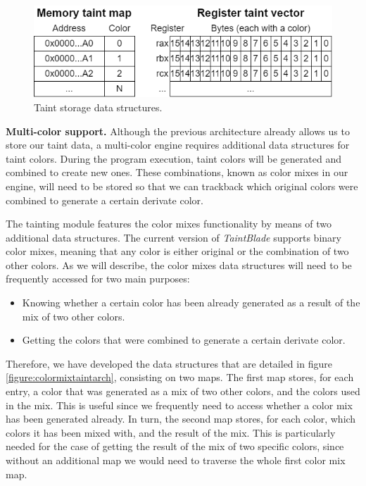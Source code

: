 \documentclass[conference]{IEEEtran}
\begin{document}
\begin{figure}
    \centerline{\includegraphics[width=0.9\columnwidth]{images/TaintingEngine.drawio.png}}
    \caption{Taint storage data structures.}
    \label{figure:taintingengine}
\end{figure}

\textbf{Multi-color support.} Although the previous architecture already allows
us to store our taint data, a multi-color engine requires additional data structures
for taint colors. During the program execution, taint colors will be generated
and combined to create new ones. These combinations, known as color mixes in
our engine, will need to be stored so that we can trackback which original colors
were combined to generate a certain derivate color.

The tainting module features the color mixes functionality by means of two
additional data structures. The current version of \textit{TaintBlade} supports
binary color mixes, meaning that any color is either original or the
combination of two other colors. As we will describe, the color mixes data
structures will need to be frequently accessed for two main purposes:
\begin{itemize}
    \item Knowing whether a certain color has been already generated as a result of the
          mix of two other colors.
    \item Getting the colors that were combined to generate a certain derivate color.
\end{itemize}

Therefore, we have developed the data structures that are detailed in figure
\ref{figure:colormixtaintarch}, consisting on two maps. The first map stores,
for each entry, a color that was generated as a mix of two other colors, and
the colors used in the mix. This is useful since we frequently need to access
whether a color mix has been generated already. In turn, the second map stores,
for each color, which colors it has been mixed with, and the result of the mix.
This is particularly needed for the case of getting the result of the mix of
two specific colors, since without an additional map we would need to traverse
the whole first color mix map.
\end{document}
